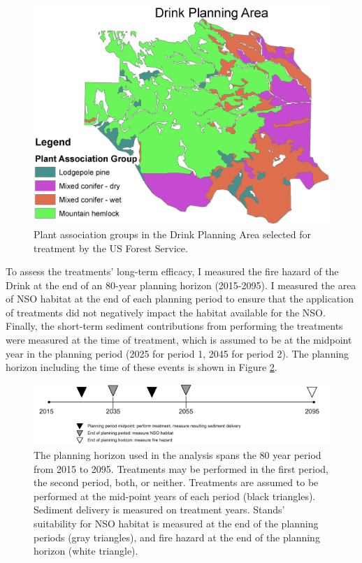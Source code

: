 \begin{figure}
\centering
\includegraphics[width=.5\textwidth]{../images/DrinkMap_PAGs}
\caption[Plant association groups in the Drink Planning Area]{Plant association groups in the Drink Planning Area selected for treatment by the US Forest Service.}
\label{fig:drinkPAGs}
\end{figure}

To assess the treatments' long-term efficacy, I measured the fire hazard of the Drink at the end of an 80-year planning horizon (2015-2095). I measured the area of NSO habitat at the end of each planning period to ensure that the application of treatments did not negatively impact the habitat available for the NSO. Finally, the short-term sediment contributions from performing the treatments were measured at the time of treatment, which is assumed to be at the midpoint year in the planning period (2025 for period 1, 2045 for period 2). The planning horizon including the time of these events is shown in Figure \ref{fig:drinkPlanningHorizon}.

\begin{figure}
\centering
\includegraphics[width=.75\textwidth]{../images/Drink_PlanningHorizon_Sketch}
\caption[Planning horizon schematic]{The planning horizon used in the analysis spans the 80 year period from 2015 to 2095. Treatments may be performed in the first period, the second period, both, or neither. Treatments are assumed to be performed at the mid-point years of each period (black triangles). Sediment delivery is measured on treatment years. Stands' suitability for NSO habitat is measured at the end of the planning periods (gray triangles), and fire hazard at the end of the planning horizon (white triangle).}
\label{fig:drinkPlanningHorizon}
\end{figure}

